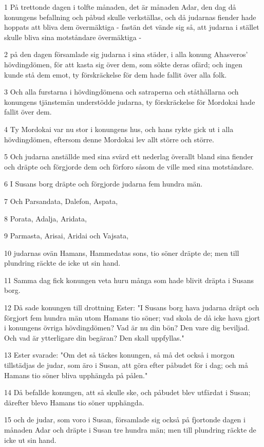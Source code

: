 \par 1 På trettonde dagen i tolfte månaden, det är månaden Adar, den dag då konungens befallning och påbud skulle verkställas, och då judarnas fiender hade hoppats att bliva dem övermäktiga - fastän det vände sig så, att judarna i stället skulle bliva sina motståndare övermäktiga -
\par 2 på den dagen församlade sig judarna i sina städer, i alla konung Ahasveros' hövdingdömen, för att kasta sig över dem, som sökte deras ofärd; och ingen kunde stå dem emot, ty förskräckelse för dem hade fallit över alla folk.
\par 3 Och alla furstarna i hövdingdömena och satraperna och ståthållarna och konungens tjänstemän understödde judarna, ty förskräckelse för Mordokai hade fallit över dem.
\par 4 Ty Mordokai var nu stor i konungens hus, och hans rykte gick ut i alla hövdingdömen, eftersom denne Mordokai lev allt större och större.
\par 5 Och judarna anställde med sina svärd ett nederlag överallt bland sina fiender och dräpte och förgjorde dem och förforo såsom de ville med sina motståndare.
\par 6 I Susans borg dräpte och förgjorde judarna fem hundra män.
\par 7 Och Parsandata, Dalefon, Aspata,
\par 8 Porata, Adalja, Aridata,
\par 9 Parmasta, Arisai, Aridai och Vajsata,
\par 10 judarnas ovän Hamans, Hammedatas sons, tio söner dräpte de; men till plundring räckte de icke ut sin hand.
\par 11 Samma dag fick konungen veta huru många som hade blivit dräpta i Susans borg.
\par 12 Då sade konungen till drottning Ester: "I Susans borg hava judarna dräpt och förgjort fem hundra män utom Hamans tio söner; vad skola de då icke hava gjort i konungens övriga hövdingdömen? Vad är nu din bön? Den vare dig beviljad. Och vad är ytterligare din begäran? Den skall uppfyllas."
\par 13 Ester svarade: "Om det så täckes konungen, så må det också i morgon tillstädjas de judar, som äro i Susan, att göra efter påbudet för i dag; och må Hamans tio söner bliva upphängda på pålen."
\par 14 Då befallde konungen, att så skulle ske, och påbudet blev utfärdat i Susan; därefter blevo Hamans tio söner upphängda.
\par 15 och de judar, som voro i Susan, församlade sig också på fjortonde dagen i månaden Adar och dräpte i Susan tre hundra män; men till plundring räckte de icke ut sin hand.
